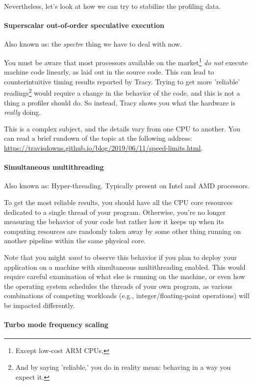 \documentclass[hidelinks,titlepage,a4paper,twoside]{article}
\begin{document}
Nevertheless, let's look at how we can try to stabilize the profiling data.

\paragraph{Superscalar out-of-order speculative execution}

Also known as: the \emph{spectre} thing we have to deal with now.

You must be aware that most processors available on the market\footnote{Except low-cost ARM CPUs.} \emph{do not} execute machine code linearly, as laid out in the source code. This can lead to counterintuitive timing results reported by Tracy. Trying to get more 'reliable' readings\footnote{And by saying 'reliable,' you do in reality mean: behaving in a way you expect it.} would require a change in the behavior of the code, and this is not a thing a profiler should do. So instead, Tracy shows you what the hardware is \emph{really} doing.

This is a complex subject, and the details vary from one CPU to another. You can read a brief rundown of the topic at the following address: \url{https://travisdowns.github.io/blog/2019/06/11/speed-limits.html}.

\paragraph{Simultaneous multithreading}

Also known as: Hyper-threading. Typically present on Intel and AMD processors.

To get the most reliable results, you should have all the CPU core resources dedicated to a single thread of your program. Otherwise, you're no longer measuring the behavior of your code but rather how it keeps up when its computing resources are randomly taken away by some other thing running on another pipeline within the same physical core.

Note that you might \emph{want} to observe this behavior if you plan to deploy your application on a machine with simultaneous multithreading enabled. This would require careful examination of what else is running on the machine, or even how the operating system schedules the threads of your own program, as various combinations of competing workloads (e.g., integer/floating-point operations) will be impacted differently.

\paragraph{Turbo mode frequency scaling}
\end{document}
